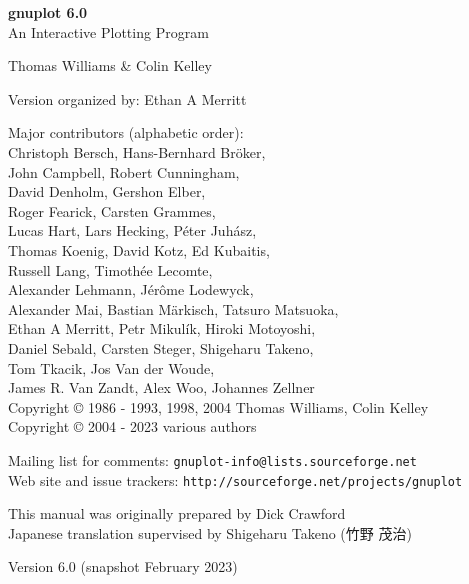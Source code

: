 \documentclass[twoside]{article}
\def\gpVersion{6.0}
\def\gnuplotVersion{\usebox\GpVersion}
\begin{document}
\sloppy
\thispagestyle{empty}
\rule{0in}{1.0in}

  \begin{center}

  {\huge\bf {gnuplot \gpVersion}}\\
  \vspace{3ex}
  {\Large An Interactive Plotting Program}\\

  \vspace{2ex}

  \large
  Thomas Williams \& Colin Kelley\\

  \vspace{2ex}

  Version
    {\gnuplotVersion }
  organized by: Ethan A Merritt\\

   \vspace{2ex}

  Major contributors (alphabetic order):\\

  Christoph Bersch,
  Hans-Bernhard Bröker,\\
  John Campbell,
  Robert Cunningham,\\
  David Denholm,
  Gershon Elber,\\
  Roger Fearick,
  Carsten Grammes,\\
  Lucas Hart,
  Lars Hecking,
  Péter Juhász,\\
  Thomas Koenig,
  David Kotz,
  Ed Kubaitis,\\
  Russell Lang,
  Timothée Lecomte,\\
  Alexander Lehmann,
  Jérôme Lodewyck,\\
  Alexander Mai,
  Bastian Märkisch,
  Tatsuro Matsuoka, \\
  Ethan A Merritt,
  Petr Mikulík,
  Hiroki Motoyoshi, \\
  Daniel Sebald,
  Carsten Steger,
  Shigeharu Takeno,\\
  Tom Tkacik,
  Jos Van der Woude,\\
  James R. Van Zandt,
  Alex Woo,
  Johannes Zellner\\
  Copyright {\copyright} 1986 - 1993, 1998, 2004   Thomas Williams, Colin Kelley\\
  Copyright {\copyright} 2004 - 2023  various authors\\

  \vspace{2ex}

  Mailing list for comments: \verb+gnuplot-info@lists.sourceforge.net+\\
  Web site and issue trackers: \verb+http://sourceforge.net/projects/gnuplot+

  \vfill
  This manual was originally prepared by Dick Crawford \\
  Japanese translation supervised by Shigeharu Takeno (竹野 茂治)

  \vspace{2ex}

   Version {\gpVersion} (snapshot February 2023)

   \end{center}
\newpage


\hypertarget{TableOfContents}{}
\tableofcontents

\newpage
\end{document}
